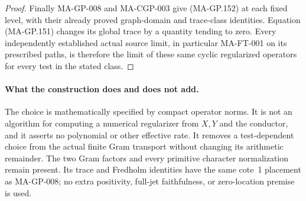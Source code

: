 \begin{proof}
Finally MA-GP-008 and MA-CGP-003 give (MA-GP.152) at
each fixed level, with their already proved graph-domain
and trace-class identities.  Equation (MA-GP.151) changes
its global trace by a quantity tending to zero.
Every independently established actual source limit,
in particular MA-FT-001 on its prescribed paths, is
therefore the limit of these same cyclic regularized
operators for every test in the stated class.
\end{proof}

\paragraph{What the construction does and does not add.}
The choice is mathematically specified by compact operator
norms.  It is not an algorithm for computing a numerical
regularizer from $X,Y$ and the conductor, and it asserts
no polynomial or other effective rate.
It removes a test-dependent choice from the actual
finite Gram transport without changing its arithmetic
remainder.  The two Gram factors and every primitive
character normalization remain present.  Its trace and
Fredholm identities have the same cote~1 placement as
MA-GP-008; no extra positivity, full-jet faithfulness,
or zero-location premise is used.
